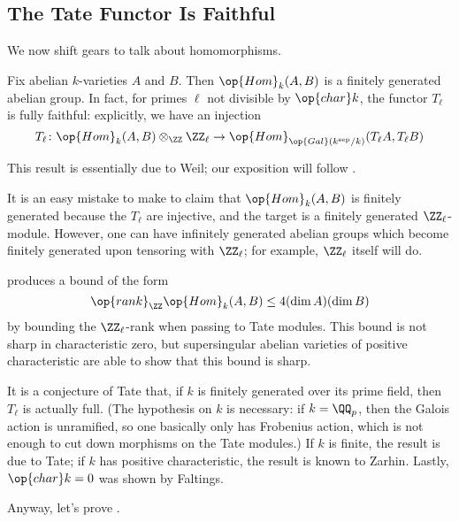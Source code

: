 \documentclass[../notes.tex]{subfiles}
\begin{document}
\subsection{The Tate Functor Is Faithful}
We now shift gears to talk about homomorphisms.
\begin{theorem} \label{thm:tate-mod-faithful}
	Fix abelian $k$-varieties $A$ and $B$. Then $\op{Hom}_k(A,B)$ is a finitely generated abelian group. In fact, for primes $\ell$ not divisible by $\op{char}k$, the functor $T_\ell$ is fully faithful: explicitly, we have an injection
	\[T_\ell\colon\op{Hom}_k(A,B)\otimes_\ZZ\ZZ_\ell\to\op{Hom}_{\op{Gal}(k^\mathrm{sep}/k)}(T_\ell A,T_\ell B)\]
\end{theorem}
This result is essentially due to Weil; our exposition will follow \cite[Theorem~IV.19.3]{mumford}.
\begin{remark}
	It is an easy mistake to make to claim that $\op{Hom}_k(A,B)$ is finitely generated because the $T_\ell$ are injective, and the target is a finitely generated $\ZZ_\ell$-module. However, one can have infinitely generated abelian groups which become finitely generated upon tensoring with $\ZZ_\ell$; for example, $\ZZ_\ell$ itself will do.
\end{remark}
\begin{remark}
	 produces a bound of the form
	\[\op{rank}_\ZZ\op{Hom}_k(A,B)\le4(\dim A)(\dim B)\]
	by bounding the $\ZZ_\ell$-rank when passing to Tate modules. This bound is not sharp in characteristic zero, but supersingular abelian varieties of positive characteristic are able to show that this bound is sharp.
\end{remark}
\begin{remark} \label{rem:tate-conjecture}
	It is a conjecture of Tate that, if $k$ is finitely generated over its prime field, then $T_\ell$ is actually full. (The hypothesis on $k$ is necessary: if $k=\QQ_p$, then the Galois action is unramified, so one basically only has Frobenius action, which is not enough to cut down morphisms on the Tate modules.) If $k$ is finite, the result is due to Tate; if $k$ has positive characteristic, the result is known to Zarhin. Lastly, $\op{char}k=0$ was shown by Faltings.
\end{remark}
Anyway, let's prove .
\end{document}
